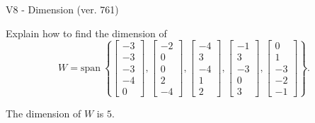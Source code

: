 \begin{exercise}
  \begin{exerciseTitle}V8 - Dimension (ver. 761)\end{exerciseTitle}
  \begin{exerciseStatement}
    Explain how to find the dimension of 
\[W=\mathrm{span}\ \left\{\left[\begin{array}{r}
-3 \\
-3 \\
-3 \\
-4 \\
0
\end{array}\right] , \left[\begin{array}{r}
-2 \\
0 \\
0 \\
2 \\
-4
\end{array}\right] , \left[\begin{array}{r}
-4 \\
3 \\
-4 \\
1 \\
2
\end{array}\right] , \left[\begin{array}{r}
-1 \\
3 \\
-3 \\
0 \\
3
\end{array}\right] , \left[\begin{array}{r}
0 \\
1 \\
-3 \\
-2 \\
-1
\end{array}\right]\right\}.\]



  \end{exerciseStatement}
  \begin{exerciseAnswer}
   The dimension of \(W\) is  \(5\).
  


  \end{exerciseAnswer}
\end{exercise}